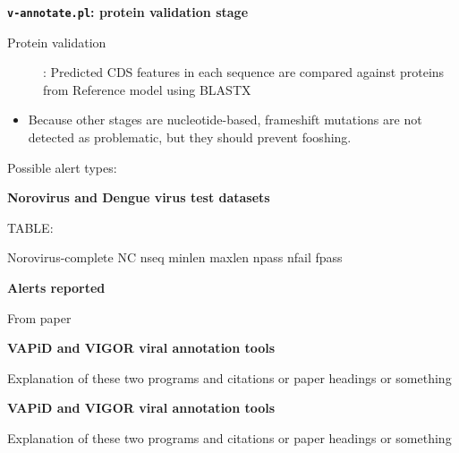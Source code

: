 \documentclass[landscape]{slides}
\begin{document}
\begin{slide}
\begin{center}
\textbf{\texttt{v-annotate.pl}: protein validation stage}
\end{center}

\begin{description}
\item[Protein validation]: Predicted CDS features in each sequence are
  compared against proteins from Reference model using BLASTX
\end{description}

\begin{itemize} 
\item Because other stages are nucleotide-based, frameshift mutations
  are not detected as problematic, but they should prevent fooshing.
\end{itemize}

Possible alert types:

\vfill
\end{slide}
\begin{slide}
\begin{center}
\textbf{Norovirus and Dengue virus test datasets}
\end{center}

TABLE:

Norovirus-complete NC nseq minlen maxlen npass nfail fpass

\vfill
\end{slide}
\begin{slide}
\begin{center}
\textbf{Alerts reported}
\end{center}

From paper

\vfill
\end{slide}
\begin{slide}
\begin{center}
\textbf{VAPiD and VIGOR viral annotation tools}
\end{center}

Explanation of these two programs and citations or paper headings or
something

\vfill
\end{slide}
\begin{slide}
\begin{center}
\textbf{VAPiD and VIGOR viral annotation tools}
\end{center}

Explanation of these two programs and citations or paper headings or
something

\vfill
\end{slide}
\end{document}
